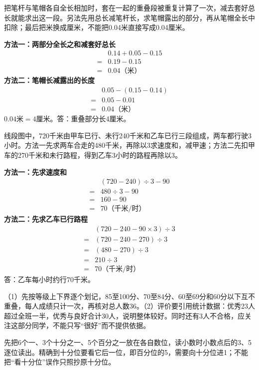 \documentclass[multi=snippet,border=0pt]{standalone}
\newenvironment{snippet}[3]{\begin{minipage}{#1bp}\color{answerred}\fontsize{#2}{#3}\selectfont\raggedright}{\end{minipage}}
\begin{document}
\begin{snippet}{505}{11.5}{14}把笔杆与笔帽各自全长相加时，套在一起的重叠段被重复计算了一次，减去套好总长就能求出这一段。另法先用总长减笔杆长，求笔帽露出的部分，再从笔帽全长中扣除；最后把米换成厘米，不能把0.04米直接写成0.04厘米。\par \textbf{方法一：两部分全长之和减套好总长}\[\begin{aligned} &0.14+0.05-0.15\\={}&0.19-0.15\\={}&0.04\text{（米）}\end{aligned}\]\textbf{方法二：笔帽长减露出的长度}\[\begin{aligned} &0.05-(0.15-0.14)\\={}&0.05-0.01\\={}&0.04\text{（米）}\end{aligned}\]\(0.04\text{米}=4\text{厘米}\)。答：重叠部分长4厘米。\end{snippet}
\begin{snippet}{505}{11.5}{14}线段图中，720千米由甲车已行、未行240千米和乙车已行三段组成，两车都行驶3小时。方法一先求两车合走的480千米，再除以3求速度和，减甲速；方法二先扣甲车的270千米和未行路程，得到乙车3小时的路程再除以3。\par \textbf{方法一：先求速度和}\[\begin{aligned} &(720-240)\div3-90\\={}&480\div3-90\\={}&160-90\\={}&70\text{（千米/时）}\end{aligned}\]\textbf{方法二：先求乙车已行路程}\[\begin{aligned} &(720-240-90\times3)\div3\\={}&(720-240-270)\div3\\={}&(480-270)\div3\\={}&210\div3\\={}&70\text{（千米/时）}\end{aligned}\]答：乙车每小时约行70千米。\end{snippet}
\begin{snippet}{505}{11.5}{14}（1）先按等级上下界逐个划记，85至100分、70至84分、60至69分和60分以下互不重叠，每人成绩只计一次，再核对总人数36。（2）评价要引用统计数据：优秀23人超过全班一半，优秀与良好合计30人，说明整体较好。同时还有3人不合格，应关注这部分同学，不能只写“很好”而不提供依据。\end{snippet}
\begin{snippet}{505}{11.5}{14}先把6个一、3个十分之一、5个百分之一放在各自数位，读小数时小数点后的3、5逐位读出。精确到十分位要看它后一位，即百分位的5，需要向十分位进1；不能把“看十分位”误作只照抄原十分位。\end{snippet}
\end{document}
